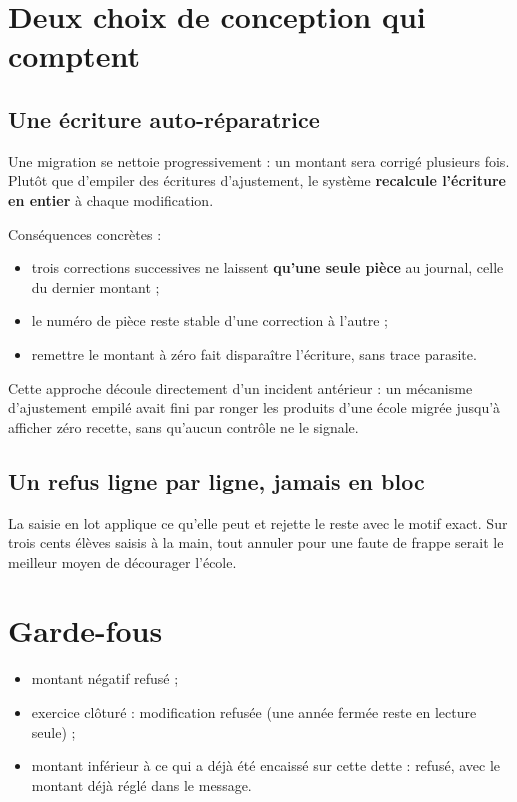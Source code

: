 \documentclass[11pt,a4paper]{report}
\begin{document}
\section{Deux choix de conception qui comptent}

\subsection{Une écriture auto-réparatrice}

Une migration se nettoie progressivement : un montant sera corrigé plusieurs
fois. Plutôt que d'empiler des écritures d'ajustement, le système
\textbf{recalcule l'écriture en entier} à chaque modification.

Conséquences concrètes :

\begin{itemize}
\item trois corrections successives ne laissent \textbf{qu'une seule pièce} au
      journal, celle du dernier montant ;
\item le numéro de pièce reste stable d'une correction à l'autre ;
\item remettre le montant à zéro fait disparaître l'écriture, sans trace
      parasite.
\end{itemize}

Cette approche découle directement d'un incident antérieur : un mécanisme
d'ajustement empilé avait fini par ronger les produits d'une école migrée
jusqu'à afficher zéro recette, sans qu'aucun contrôle ne le signale.

\subsection{Un refus ligne par ligne, jamais en bloc}

La saisie en lot applique ce qu'elle peut et rejette le reste avec le motif
exact. Sur trois cents élèves saisis à la main, tout annuler pour une faute de
frappe serait le meilleur moyen de décourager l'école.

\section{Garde-fous}

\begin{itemize}
\item montant négatif refusé ;
\item exercice clôturé : modification refusée (une année fermée reste en
      lecture seule) ;
\item montant inférieur à ce qui a déjà été encaissé sur cette dette : refusé,
      avec le montant déjà réglé dans le message.
\end{itemize}
\end{document}
